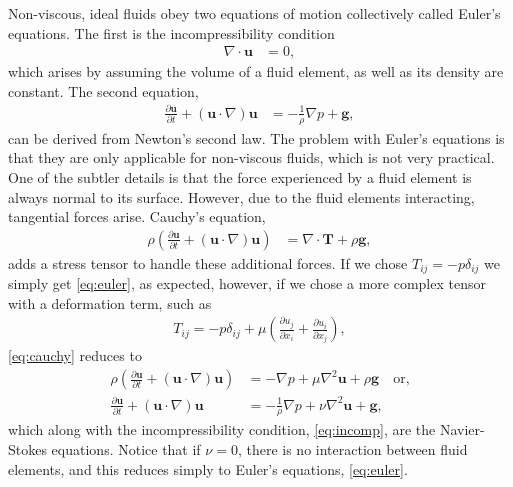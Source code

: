 \documentclass[10pt, titlepage]{article}
\begin{document}
Non-viscous, ideal fluids obey two equations of motion collectively called Euler's equations. The first is the incompressibility condition 
\begin{align}
\nabla \cdot \mathbf{u} &= 0,
\label{eq:incomp}
\end{align}
which arises by assuming the volume of a fluid element, as well as its density are constant. The second equation,
\begin{align}
\frac{\partial \mathbf{u}}{\partial t} + \left( \mathbf{u} \cdot \nabla \right) \mathbf{u} &= - \frac{1}{\rho} \nabla p + \mathbf{g}, \label{eq:euler}
\end{align}
can be derived from Newton's second law. The problem with Euler's equations is that they are only applicable for non-viscous fluids, which is not very practical. One of the subtler details is that the force experienced by a fluid element is always normal to its surface. However, due to the fluid elements interacting, tangential forces arise. Cauchy's equation,
\begin{align}
\rho \left( \frac{\partial \mathbf{u}}{\partial t} + \left( \mathbf{u} \cdot \nabla \right) \mathbf{u} \right) &= \nabla \cdot \mathbf{T} + \rho \mathbf{g},
\label{eq:cauchy}
\end{align}
adds a stress tensor to handle these additional forces. If we chose $T_{ij} = -p \delta_{ij}$ we simply get \eqref{eq:euler}, as expected, however, if we chose a more complex tensor with a deformation term, such as
\begin{align*}
T_{ij} = -p \delta_{ij} + \mu \left( \frac{\partial u_j}{\partial x_i} + \frac{\partial u_i}{\partial x_j} \right),
\end{align*}
\eqref{eq:cauchy} reduces to 
\begin{align}
\rho \left( \frac{\partial \mathbf{u}}{\partial t} + \left( \mathbf{u} \cdot \nabla \right) \mathbf{u} \right) &= - \nabla p + \mu \nabla^2 \mathbf{u} + \rho \mathbf{g} \quad \text{or,} \nonumber \\
\frac{\partial \mathbf{u}}{\partial t} + \left( \mathbf{u} \cdot \nabla \right) \mathbf{u} &= - \frac{1}{\rho} \nabla p + \nu \nabla^2 \mathbf{u} + \mathbf{g}, \label{eq:NSE}
\end{align}
which along with the incompressibility condition, \eqref{eq:incomp}, are the Navier-Stokes equations. Notice that if $\nu = 0$, there is no interaction between fluid elements, and this reduces simply to Euler's equations, \eqref{eq:euler}. 
\end{document}
